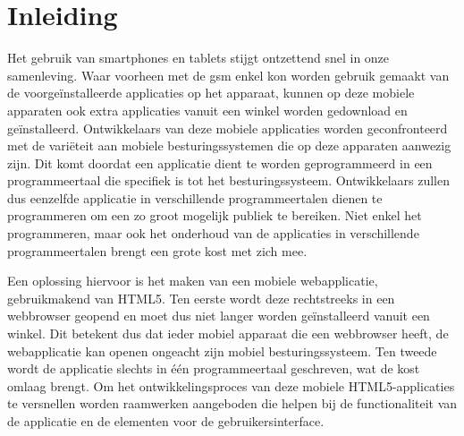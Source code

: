 
\chapter{Inleiding} %
\label{inleiding}


Het gebruik van smartphones en tablets stijgt ontzettend snel in onze samenleving.
Waar voorheen met de gsm enkel kon worden gebruik gemaakt van de voorgeïnstalleerde applicaties op het apparaat, kunnen op deze mobiele apparaten ook extra applicaties vanuit een winkel worden gedownload en geïnstalleerd.
Ontwikkelaars van deze mobiele applicaties worden geconfronteerd met de variëteit aan mobiele besturingssystemen die op deze apparaten aanwezig zijn.
Dit komt doordat een applicatie dient te worden geprogrammeerd in een programmeertaal die specifiek is tot het besturingssysteem.
Ontwikkelaars zullen dus eenzelfde applicatie in verschillende programmeertalen dienen te programmeren om een zo groot mogelijk publiek te bereiken.
Niet enkel het programmeren, maar ook het onderhoud van de applicaties in verschillende programmeertalen brengt een grote kost met zich mee.

Een oplossing hiervoor is het maken van een mobiele webapplicatie, gebruikmakend van HTML5.
Ten eerste wordt deze rechtstreeks in een webbrowser geopend en moet dus niet langer worden geïnstalleerd vanuit een winkel.
Dit betekent dus dat ieder mobiel apparaat die een webbrowser heeft, de webapplicatie kan openen ongeacht zijn mobiel besturingssysteem.
Ten tweede wordt de applicatie slechts in één programmeertaal geschreven, wat de kost omlaag brengt.
Om het ontwikkelingsproces van deze mobiele HTML5-applicaties te versnellen worden raamwerken aangeboden die helpen bij de functionaliteit van de applicatie en de elementen voor de gebruikersinterface. 

